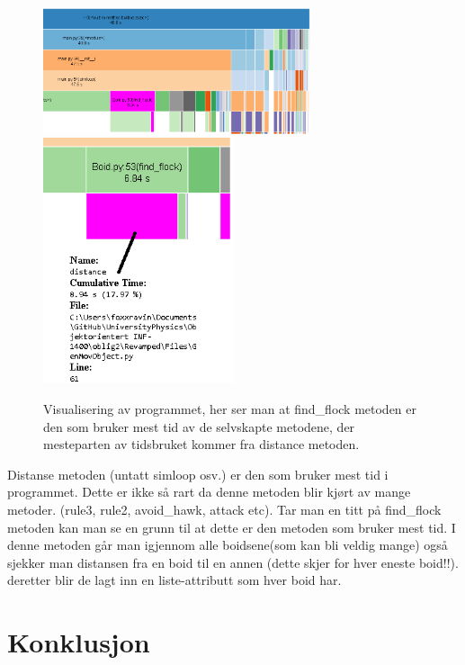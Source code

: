 {\begin{figure}[hbt!]
{\centering
    \includegraphics[width=0.70\textwidth]{systeminfo.png}
    \includegraphics[width=0.50\textwidth]{systeminfo2.png}
    \caption{Visualisering av programmet, her ser man at find\_flock metoden er den som bruker mest tid av de selvskapte metodene, der mesteparten av tidsbruket kommer fra distance metoden.}
    \label{Evaluasjon}
\par}
\end{figure}

Distanse metoden (untatt simloop osv.) er den som bruker mest tid i programmet. Dette er ikke så rart da denne metoden blir kjørt av mange metoder. (rule3, rule2, avoid\_hawk, attack etc). Tar man en titt på find\_flock metoden kan man se en grunn til at dette er den metoden som bruker mest tid. I denne metoden går man igjennom alle boidsene(som kan bli veldig mange) også sjekker man distansen fra en boid til en annen (dette skjer for hver eneste boid!!). deretter blir de lagt inn en liste-attributt som hver boid har.


\section{Konklusjon}

}
